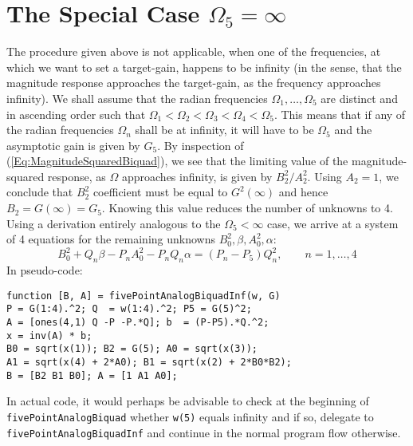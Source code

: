 \section{The Special Case $\Omega_5 = \infty$}
The procedure given above is not applicable, when one of the frequencies, at which we want to set a target-gain, happens to be infinity (in the sense, that the magnitude response approaches the target-gain, as the frequency approaches infinity). We shall assume that the radian frequencies $\Omega_1, \ldots, \Omega_5$ are distinct and in ascending order such that $\Omega_1 < \Omega_2 < \Omega_3 < \Omega_4 < \Omega_5$. This means that if any of the radian frequencies $\Omega_n$ shall be at infinity, it will have to be $\Omega_5$ and the asymptotic gain is given by $G_5$. By inspection of (\ref{Eq:MagnitudeSquaredBiquad}), we see that the limiting value of the magnitude-squared response, as $\Omega$ approaches infinity, is given by $B_2^2 / A_2^2$. Using $A_2 = 1$, we conclude that $B_2^2$ coefficient must be equal to $G^2(\infty)$ and hence $B_2 = G(\infty) = G_5$. Knowing this value reduces the number of unknowns to 4. Using a derivation entirely analogous to the $\Omega_5 < \infty$ case, we arrive at a system of 4 equations for the remaining unknowns $B_0^2, \beta, A_0^2, \alpha$:
\begin{equation}
  B_0^2 + Q_n \beta - P_n A_0^2 - P_n Q_n \alpha = (P_n - P_5) Q_n^2, \qquad n = 1, \ldots, 4
\end{equation}
In pseudo-code:
\begin{verbatim}
function [B, A] = fivePointAnalogBiquadInf(w, G)
P = G(1:4).^2; Q  = w(1:4).^2; P5 = G(5)^2;
A = [ones(4,1) Q -P -P.*Q]; b  = (P-P5).*Q.^2;
x = inv(A) * b;
B0 = sqrt(x(1)); B2 = G(5); A0 = sqrt(x(3));
A1 = sqrt(x(4) + 2*A0); B1 = sqrt(x(2) + 2*B0*B2);
B = [B2 B1 B0]; A = [1 A1 A0];
\end{verbatim}
In actual code, it would perhaps be advisable to check at the beginning of \texttt{fivePointAnalogBiquad} whether \texttt{w(5)} equals infinity and if so, delegate to \texttt{fivePointAnalogBiquadInf} and continue in the normal program flow otherwise.


